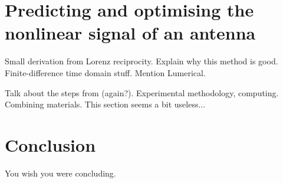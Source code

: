 \documentclass[12pt,a4paper]{article}
\begin{document}
\section{Predicting and optimising the nonlinear signal of an antenna}
Small derivation from Lorenz reciprocity. Explain why this method is good. Finite-difference time domain stuff. Mention Lumerical.

Talk about the steps from \cite{koshelevSubwavelengthDielectricResonators2020} (again?). Experimental methodology, computing. Combining materials. This section seems a bit useless...

\section{Conclusion}
You wish you were concluding\cite{aluTheoryModelingFeatures2013}.



\end{document}
